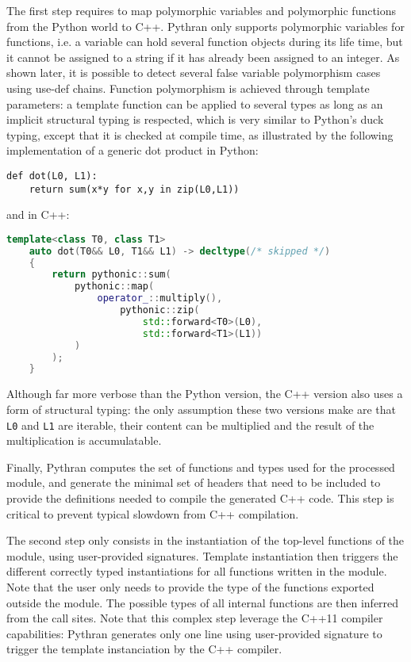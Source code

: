 \documentclass[10pt, onecolumn, preprint]{sigplanconf}
\begin{document}
The first step requires to map polymorphic variables and polymorphic functions
from the Python world to C++. Pythran only supports polymorphic variables for
functions, i.e. a variable can hold several function objects during its life
time, but it cannot be assigned to a string if it has already been assigned to
an integer. As shown later, it is possible to detect several false variable
polymorphism cases using use-def chains. Function polymorphism is achieved
through template parameters: a template function can be applied to several
types as long as an implicit structural typing is respected, which is very
similar to Python's duck typing, except that it is checked at compile time, as
illustrated by the following implementation of a generic dot product in Python:

\begin{lstlisting}
def dot(L0, L1):
    return sum(x*y for x,y in zip(L0,L1))
\end{lstlisting}

\noindent and in C++:

\begin{lstlisting}[language=c++]
template<class T0, class T1>
    auto dot(T0&& L0, T1&& L1) -> decltype(/* skipped */)
    {
        return pythonic::sum(
            pythonic::map(
                operator_::multiply(),
                    pythonic::zip(
                        std::forward<T0>(L0),
                        std::forward<T1>(L1))
            )
        );
    }
\end{lstlisting}

Although far more verbose than the Python version, the C++ version also uses a
form of structural typing: the only assumption these two versions make are that
\texttt{L0} and \texttt{L1} are iterable, their content can be multiplied and the result of
the multiplication is accumulatable.

Finally, Pythran computes the set of functions and types used for the processed
module, and generate the minimal set of headers that need to be included to
provide the definitions needed to compile the generated C++ code. This step is
critical to prevent typical slowdown from C++ compilation.

The second step only consists in the instantiation of the top-level functions of
the module, using user-provided signatures. Template instantiation then triggers
the different correctly typed instantiations for all functions written in the
module. Note that the user only needs to provide the type of the functions
exported outside the module. The possible types of all internal functions are
then inferred from the call sites. Note that this complex step leverage the 
C++11 compiler capabilities: Pythran generates only one line using user-provided
signature to trigger the template instanciation by the C++ compiler.
\end{document}
